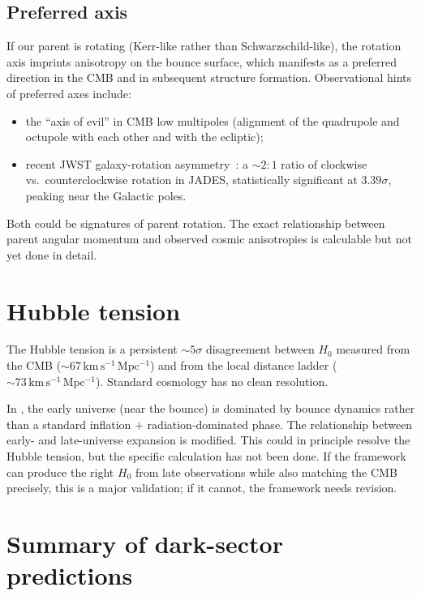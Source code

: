\subsection{Preferred axis}

If our parent is rotating (Kerr-like rather than Schwarzschild-like), the
rotation axis imprints anisotropy on the bounce surface, which manifests as a
preferred direction in the CMB and in subsequent structure formation.
Observational hints of preferred axes include:

\begin{itemize}
  \item the ``axis of evil'' in CMB low multipoles (alignment of the quadrupole
    and octupole with each other and with the ecliptic);
  \item recent JWST galaxy-rotation asymmetry~\citep{shamir2025}: a $\sim 2\!:\!1$
    ratio of clockwise vs.\ counterclockwise rotation in JADES, statistically
    significant at $3.39\sigma$, peaking near the Galactic poles.
\end{itemize}

Both could be signatures of parent rotation. The exact relationship between
parent angular momentum and observed cosmic anisotropies is calculable but not
yet done in detail.

\section{Hubble tension}

The Hubble tension is a persistent $\sim 5\sigma$ disagreement between $H_0$
measured from the CMB ($\sim 67\,\mathrm{km\,s^{-1}\,Mpc^{-1}}$) and from the
local distance ladder ($\sim 73\,\mathrm{km\,s^{-1}\,Mpc^{-1}}$). Standard
cosmology has no clean resolution.

In \SCT, the early universe (near the bounce) is dominated by bounce dynamics
rather than a standard inflation $+$ radiation-dominated phase. The relationship
between early- and late-universe expansion is modified. This could in principle
resolve the Hubble tension, but the specific calculation has not been done. If
the framework can produce the right $H_0$ from late observations while also
matching the CMB precisely, this is a major validation; if it cannot, the
framework needs revision.

\section{Summary of dark-sector predictions}

